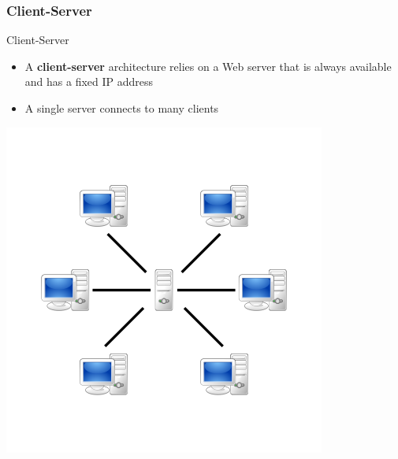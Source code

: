 \documentclass{beamer}
\begin{document}
       
        \subsubsection{Client-Server}
        \begin{frame}{Client-Server}
            \begin{itemize}
                \item A \textbf{client-server} architecture relies on a Web server that is always available and has a fixed IP address\\
                \item A single server connects to many clients
            \end{itemize}
            \centering
            \includegraphics[scale=0.5]{Server-based-network.png}
        \end{frame}
       
       
\end{document}
